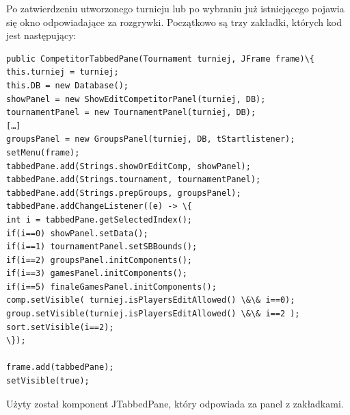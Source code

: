 Po zatwierdzeniu utworzonego turnieju lub po wybraniu już istniejącego pojawia się okno odpowiadające za rozgrywki. Początkowo są trzy zakładki, których kod jest następujący:
\begin{verbatim}
public CompetitorTabbedPane(Tournament turniej, JFrame frame)\{
this.turniej = turniej;
this.DB = new Database();
showPanel = new ShowEditCompetitorPanel(turniej, DB);
tournamentPanel = new TournamentPanel(turniej, DB);
[…]
groupsPanel = new GroupsPanel(turniej, DB, tStartlistener);
setMenu(frame);
tabbedPane.add(Strings.showOrEditComp, showPanel);
tabbedPane.add(Strings.tournament, tournamentPanel);
tabbedPane.add(Strings.prepGroups, groupsPanel);
tabbedPane.addChangeListener((e) -> \{
int i = tabbedPane.getSelectedIndex();
if(i==0) showPanel.setData();
if(i==1) tournamentPanel.setSBBounds();
if(i==2) groupsPanel.initComponents();
if(i==3) gamesPanel.initComponents();
if(i==5) finaleGamesPanel.initComponents();
comp.setVisible( turniej.isPlayersEditAllowed() \&\& i==0);
group.setVisible(turniej.isPlayersEditAllowed() \&\& i==2 );
sort.setVisible(i==2);
\});

frame.add(tabbedPane);
setVisible(true);
\end{verbatim}
Użyty został komponent JTabbedPane, który odpowiada za panel z zakładkami. 

